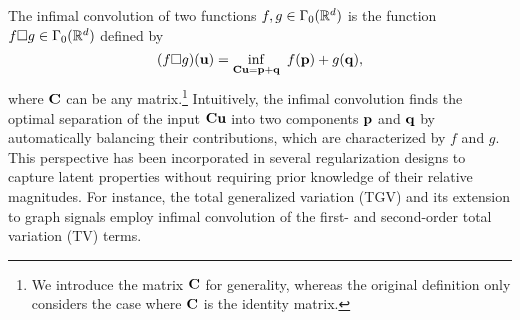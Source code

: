 The infimal convolution \cite{infimal_convolution} of two functions $f, g \in \Gamma_0 (\mathbb{R}^{d})$ is the function $f \square g \in \Gamma_0 (\mathbb{R}^{d})$ defined by
\begin{equation}
    (f \square g) (\mathbf{u}) = \inf_{\mathbf{C} \mathbf{u} = \mathbf{p} + \mathbf{q}} \  f (\mathbf{p}) + g (\mathbf{q}),
\end{equation}
where $\mathbf{C}$ can be any matrix.\footnote{We introduce the matrix $\mathbf{C}$ for generality, whereas the original definition only considers the case where $\mathbf{C}$ is the identity matrix.}
Intuitively, the infimal convolution finds the optimal separation of the input $\mathbf{C} \mathbf{u}$ into two components $\mathbf{p}$ and $\mathbf{q}$ by automatically balancing their contributions, which are characterized by $f$ and $g$.
This perspective has been incorporated in several regularization designs to capture latent properties without requiring prior knowledge of their relative magnitudes.
For instance, the total generalized variation (TGV) \cite{bredies2010total} and its extension to graph signals \cite{ono2015total} employ infimal convolution of the first- and second-order total variation (TV) terms.